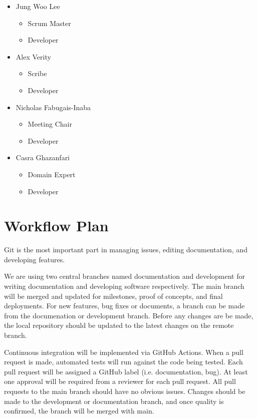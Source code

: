 \documentclass{article}
\begin{document}
\begin{itemize}
	\item Jung Woo Lee
	\begin{itemize}
	  \item Scrum Master
	  \item Developer
  \end{itemize}
	\item Alex Verity
  \begin{itemize}
    \item Scribe
	  \item Developer
  \end{itemize}
  \item Nicholas Fabugais-Inaba
  \begin{itemize}
    \item Meeting Chair
	  \item Developer
  \end{itemize}
  \item Casra Ghazanfari
  \begin{itemize}
    \item Domain Expert
	  \item Developer
  \end{itemize}
\end{itemize}

\section{Workflow Plan}

Git is the most important part in managing issues, editing documentation, and developing features.
\newline

We are using two central branches named documentation and development for writing documentation
and developing software respectively.
The main branch will be merged and updated for milestones, proof of concepts, and
final deployments.
For new features, bug fixes or documents, a branch can be made from the documenation or development branch.
Before any changes are be made, the local repository should be updated to the latest changes on
the remote branch.\newline

Continuous integration will be implemented via GitHub Actions. When a pull request is made, automated
tests will run against the code being tested.
Each pull request will be assigned a GitHub label (i.e. documentation, bug). At least one
approval will be required from a reviewer for each pull request.
All pull requests to the main branch should have no obvious issues. Changes should be made
to the development or documentation branch, and once quality is confirmed, the branch will
be merged with main.\newline
\end{document}
